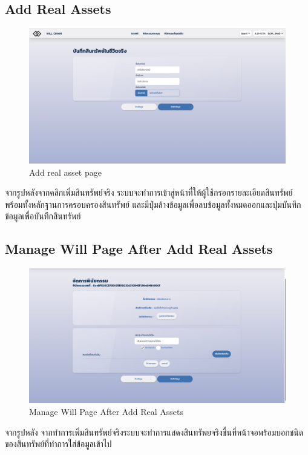 \documentclass[12pt,oneside,openright,a4paper]{cpe-thai-project}
\begin{document}
\subsection{Add Real Assets }
	\begin{figure}[!thb]
			\centering
			\includegraphics[scale=0.2]{Addwillpage}
			\caption{Add real asset page}
		\end{figure}
		\FloatBarrier
\tab จากรูปหลังจากคลิกเพิ่มสินทรัพย์จริง ระบบจะทำการเข้าสู่หน้าที่ให้ผู้ใช้กรอกรายละเอียดสินทรัพย์พร้อมทั้งหลักฐานการครอบครองสินทรัพย์ และมีปุ่มล้างข้อมูลเพื่อลบข้อมูลทั้งหมดออกและปุ่มบันทึกข้อมูลเพื่อบันทึกสินทรัพย์

\subsection{Manage Will Page After Add Real Assets }
	\begin{figure}[!thb]
			\centering
			\includegraphics[scale=0.2]{manageWillRealAsset4}
			\caption{Manage Will Page After Add Real Assets }
		\end{figure}
		\FloatBarrier
\tab จากรูปหลัง จากทำการเพิ่มสินทรัพย์จริงระบบจะทำการแสดงสินทรัพยจริงขึ้นที่หน้าจอพร้อมบอกชนิดของสินทรัพย์ที่ทำการใส่ข้อมูลเข้าไป
\end{document}
